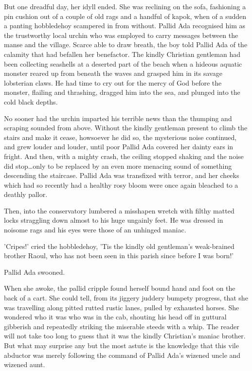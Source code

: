 But one dreadful day, her idyll ended. She was reclining on the sofa, fashioning a pin cushion out of a couple of old rags and a handful of kapok, when of a sudden a panting hobbledehoy scampered in from without. Pallid Ada recognised him as the trustworthy local urchin who was employed to carry messages between the manse and the village. Scarce able to draw breath, the boy told Pallid Ada of the calamity that had befallen her benefactor. The kindly Christian gentleman had been collecting seashells at a deserted part of the beach when a hideous aquatic monster reared up from beneath the waves and grasped him in its savage lobsterian claws. He had time to cry out for the mercy of God before the monster, flailing and thrashing, dragged him into the sea, and plunged into the cold black depths.

No sooner had the urchin imparted his terrible news than the thumping and scraping sounded from above. Without the kindly gentleman present to climb the stairs and make it cease, howsoever he did so, the mysterious noise continued, and grew louder and louder, until poor Pallid Ada covered her dainty ears in fright. And then, with a mighty crash, the ceiling stopped shaking and the noise did stop\ldots  only to be replaced by an even more menacing sound of something descending the staircase. Pallid Ada was transfixed with terror, and her cheeks which had so recently had a healthy rosy bloom were once again bleached to a deathly pallor.

Then, into the conservatory lumbered a misshapen wretch with filthy matted locks straggling down almost to his huge ungainly feet. He was dressed in noisome rags and his eyes were those of an unhinged maniac.

'Cripes!' cried the hobbledehoy, 'Tis the kindly old gentleman's weak-brained brother Raoul, who has not been seen in this parish since before I was born!'

Pallid Ada swooned.

When she awoke, the pallid cripple found herself bound hand and foot on the back of a cart. She could tell, from its jiggery juddery bumpety progress, that she was travelling along pitted rutted rustic lanes, pulled by exhausted horses. She wondered who it was who was in the cab, shouting his head off in guttural gibberish and repeatedly striking the miserable steeds with a whip. The reader will not take too long to guess that it was the kindly Christian's maniac brother. But what may surprise any but the most astute is the knowledge that this vile abductor was merely following the command of Pallid Ada's wizened uncle and wizened aunt.

